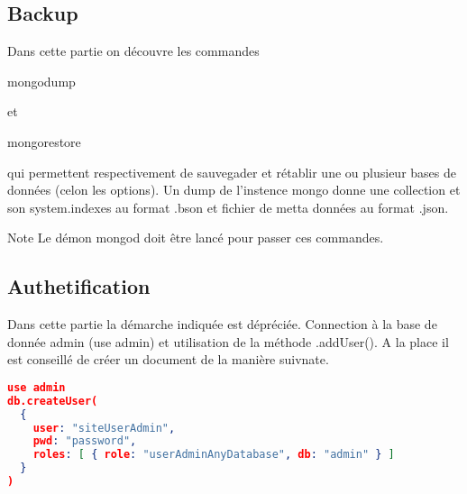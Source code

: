 \subsection{Backup}
    \par Dans cette partie on découvre les commandes \begin{tt}mongodump\end{tt} et \begin{tt}mongorestore\end{tt} qui permettent respectivement de sauvegader et rétablir une ou plusieur bases de données (celon les options). Un dump de l'instence mongo donne une collection et son system.indexes au format .bson et fichier de metta données au format .json.
    
    \begin{block}{Note} Le démon mongod doit être lancé pour passer ces commandes.
    \end{block}
    
\subsection{Authetification}
    \par Dans cette partie la démarche indiquée est dépréciée. Connection à la base de donnée admin (use admin) et utilisation de la méthode .addUser(). A la place il est conseillé de créer un document de la manière suivnate. 

\begin{lstlisting}[language=JSON, caption=Création d"un user]
use admin
db.createUser(
  {
    user: "siteUserAdmin",
    pwd: "password",
    roles: [ { role: "userAdminAnyDatabase", db: "admin" } ]
  }
)
\end{lstlisting}